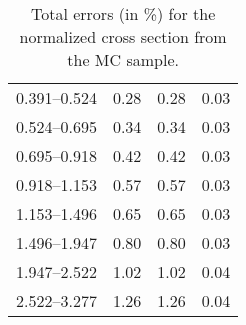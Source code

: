 \begin{table}
\begin{center}
\begin{tabular}{@{}l l l l@{}}
            0.391--0.524 & 0.28 & 0.28 & 0.03  \\
            0.524--0.695 & 0.34 & 0.34 & 0.03  \\
            0.695--0.918 & 0.42 & 0.42 & 0.03  \\
            0.918--1.153 & 0.57 & 0.57 & 0.03  \\
            1.153--1.496 & 0.65 & 0.65 & 0.03  \\
            1.496--1.947 & 0.80 & 0.80 & 0.03  \\
            1.947--2.522 & 1.02 & 1.02 & 0.04  \\
            2.522--3.277 & 1.26 & 1.26 & 0.04  \\
            \bottomrule
        \end{tabular}
    \end{center}
    \caption{
        Total errors (in \%) for the normalized cross section from the
        \MADGRAPH MC sample.
    }
    \label{tab:madgraph_uncert_norm}
\end{table}
